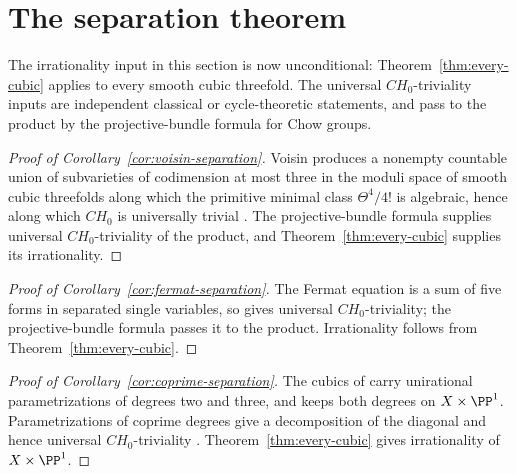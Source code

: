 \section{The separation theorem}
\label{sec:synthesis}

The irrationality input in this section is now unconditional:
Theorem~\ref{thm:every-cubic} applies to every smooth cubic threefold.  The
universal \(CH_0\)-triviality inputs are independent classical or
cycle-theoretic statements, and pass to the product by the projective-bundle
formula for Chow groups.

\begin{proof}[Proof of Corollary~\ref{cor:voisin-separation}]
Voisin produces a nonempty countable union of subvarieties of codimension at
most three in the moduli space of smooth cubic threefolds along which the
primitive minimal class \(\Theta^4/4!\) is algebraic, hence along which
\(CH_0\) is universally trivial \cite[Theorem~4.5 and Lemma~4.6]{Voisin}.
The projective-bundle formula supplies universal \(CH_0\)-triviality of the
product, and Theorem~\ref{thm:every-cubic} supplies its irrationality.
%
%
%
\end{proof}

\begin{proof}[Proof of Corollary~\ref{cor:fermat-separation}]
The Fermat equation is a sum of five forms in separated single variables, so
\cite{CT} gives universal \(CH_0\)-triviality; the projective-bundle formula
passes it to the product.  Irrationality follows from
Theorem~\ref{thm:every-cubic}.
%
%
%
\end{proof}

\begin{proof}[Proof of Corollary~\ref{cor:coprime-separation}]
The cubics of \cite[Theorem~3.3]{YYZ} carry unirational parametrizations of
degrees two and three, and \cite[Corollary~3.5]{YYZ} keeps both degrees on
\(X\times\PP^1\).  Parametrizations of coprime degrees give a decomposition
of the diagonal and hence universal \(CH_0\)-triviality
\cite[Section~1]{YYZ}.  Theorem~\ref{thm:every-cubic} gives irrationality of
\(X\times\PP^1\).
%
%
%
\end{proof}


